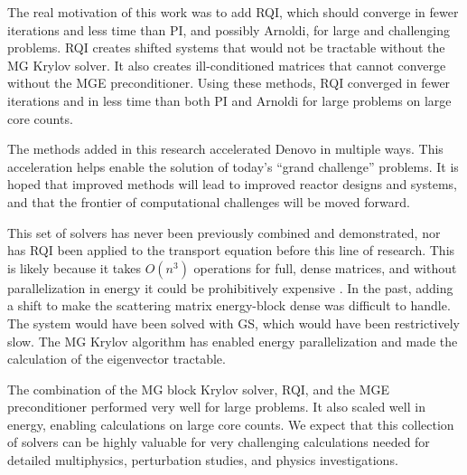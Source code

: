 \documentclass{article}                                                                           %
\begin{document}
The real motivation of this work was to add RQI, which should converge in fewer iterations and less time than PI, and possibly Arnoldi, for large and challenging problems. RQI creates shifted systems that would not be tractable without the MG Krylov solver. It also creates ill-conditioned matrices that cannot converge without the MGE preconditioner. Using these methods, RQI converged in fewer iterations and in less time than both PI and Arnoldi for large problems on large core counts. 

The methods added in this research accelerated Denovo in multiple ways. This acceleration helps enable the solution of today's ``grand challenge'' problems. It is hoped that improved methods will lead to improved reactor designs and systems, and that the frontier of computational challenges will be moved forward.



%

This set of solvers has never been previously combined and demonstrated, nor has RQI been applied to the transport equation before this line of research. This is likely because it takes $O(n^{3})$ operations for full, dense matrices, and without parallelization in energy it could be prohibitively expensive \cite{Stewart2001}. In the past, adding a shift to make the scattering matrix energy-block dense was difficult to handle. The system would have been solved with GS, which would have been restrictively slow. The MG Krylov algorithm has enabled energy parallelization and made the calculation of the eigenvector tractable. 

The combination of the MG block Krylov solver, RQI, and the MGE preconditioner performed very well for large problems. It also scaled well in energy, enabling calculations on large core counts. We expect that this collection of solvers can be highly valuable for very challenging calculations needed for detailed multiphysics, perturbation studies, and physics investigations. 
\end{document}
